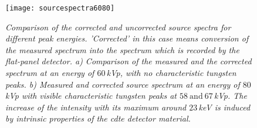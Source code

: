 \begin{figure}
	\begin{center}
		\texttt{[image: sourcespectra6080]}
	\end{center}
	\caption[Corrected and uncorrected source spectra for different peak-energies]{\textit{Comparison of the corrected and uncorrected source spectra for different peak energies. 'Corrected' in this case  means conversion of the measured spectrum into the spectrum which is recorded by the flat-panel detector. a) Comparison of the measured and the corrected spectrum at an energy of $60\,$kVp, with no characteristic tungsten peaks. b) Measured and corrected source spectrum at an energy of $80\,$kVp with visible characteristic tungsten peaks at $ 58\ \text{and}\ 67\,$kVp. The increase of the intensity with its maximum around $23\,$keV is induced by intrinsic properties of the \gls{cdte} detector material.}}
	\label{spectra6080}
\end{figure}    
